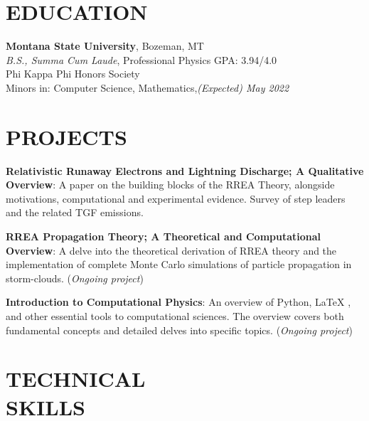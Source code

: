 \documentclass[margin]{res}
\begin{document}
\begin{resume}

\section{EDUCATION}
\raggedright
\textbf{Montana State University}, Bozeman, MT\\\vspace{0.5ex}
{\sl B.S., Summa Cum Laude}, Professional Physics \hfill GPA: 3.94/4.0\\
Phi Kappa Phi Honors Society\\
Minors in: Computer Science, Mathematics,\hfill {\sl (Expected) May 2022}


\section{PROJECTS}
\raggedright
\par
\textbf{Relativistic Runaway Electrons and Lightning Discharge; A Qualitative Overview}: 
A paper on the building blocks of the RREA Theory, alongside motivations, computational and experimental evidence. Survey of step leaders and the related TGF emissions.
\par
\textbf{RREA Propagation Theory; A Theoretical and Computational Overview}:
A delve into the theoretical derivation of RREA theory and the implementation of complete Monte Carlo simulations of particle propagation in storm-clouds. ({\sl Ongoing project})
\par 
\textbf{Introduction to Computational Physics}:
An overview of Python, LaTeX , and other essential tools to computational sciences. The overview covers both fundamental concepts and detailed delves into specific topics. ({\sl Ongoing project})


\section{TECHNICAL\\SKILLS}


\end{resume}
\end{document}
